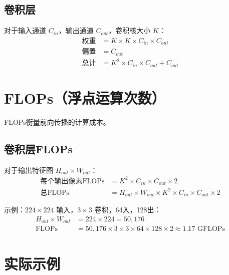 \subsection{卷积层}

对于输入通道 $C_{in}$，输出通道 $C_{out}$，卷积核大小 $K$：
\begin{align}
\text{权重} &= K \times K \times C_{in} \times C_{out} \\
\text{偏置} &= C_{out} \\
\text{总计} &= K^2 \times C_{in} \times C_{out} + C_{out}
\end{align}

\section{FLOPs（浮点运算次数）}

FLOPs衡量前向传播的计算成本。

\subsection{卷积层FLOPs}

对于输出特征图 $H_{out} \times W_{out}$：
\begin{align}
\text{每个输出像素FLOPs} &= K^2 \times C_{in} \times C_{out} \times 2 \\
\text{总FLOPs} &= H_{out} \times W_{out} \times K^2 \times C_{in} \times C_{out} \times 2
\end{align}

示例：$224\times224$ 输入，$3\times3$ 卷积，64入，128出：
\begin{align}
H_{out} \times W_{out} &= 224 \times 224 = 50,176 \\
\text{FLOPs} &= 50,176 \times 3 \times 3 \times 64 \times 128 \times 2 \approx 1.17 \text{ GFLOPs}
\end{align}

\section{实际示例}

